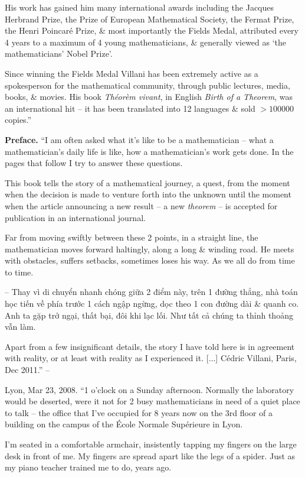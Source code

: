 \documentclass{article}
\begin{document}
\begin{enumerate}
	His work has gained him many international awards including the Jacques Herbrand Prize, the Prize of European Mathematical Society, the Fermat Prize, the Henri Poincar\'e Prize, \& most importantly the Fields Medal, attributed every 4 years to a maximum of 4 young mathematicians, \& generally viewed as `the mathematicians' Nobel Prize'.

	Since winning the Fields Medal {\sc Villani} has been extremely active as a spokesperson for the mathematical community, through public lectures, media, books, \& movies. His book {\it Th\'eor\`em vivant}, in English {\it Birth of a Theorem}, was an international hit -- it has been translated into 12 languages \& sold $> 100000$ copies.''

	{\bf Preface.} ``I am often asked what it's like to be a mathematician -- what a mathematician's daily life is like, how a mathematician's work gets done. In the pages that follow I try to answer these questions.

	This book tells the story of a mathematical journey, a quest, from the moment when the decision is made to venture forth into the unknown until the moment when the article announcing a new result -- a new {\it theorem} -- is accepted for publication in an international journal.

	Far from moving swiftly between these 2 points, in a straight line, the mathematician moves forward haltingly, along a long \& winding road. He meets with obstacles, suffers setbacks, sometimes loses his way. As we all do from time to time.

	-- Thay vì di chuyển nhanh chóng giữa 2 điểm này, trên 1 đường thẳng, nhà toán học tiến về phía trước 1 cách ngập ngừng, dọc theo 1 con đường dài \& quanh co. Anh ta gặp trở ngại, thất bại, đôi khi lạc lối. Như tất cả chúng ta thỉnh thoảng vẫn làm.

	Apart from a few insignificant details, the story I have told here is in agreement with reality, or at least with reality as I experienced it. [$\ldots$] {\sc C\'edric Villani}, Paris, Dec 2011.'' -- \cite[p. 5]{Villani2015}

	 Lyon, Mar 23, 2008. ``1 o'clock on a Sunday afternoon. Normally the laboratory would be deserted, were it not for 2 busy mathematicians in need of a quiet place to talk -- the office that I've occupied for  8 years now on the 3rd floor of a building on the campus of the \'Ecole Normale Sup\'erieure in Lyon.

	I'm seated in a comfortable armchair, insistently tapping my fingers on the large desk in front of me. My fingers are spread apart like the legs of a spider. Just as my piano teacher trained me to do, years ago.


\end{enumerate}
\end{document}
